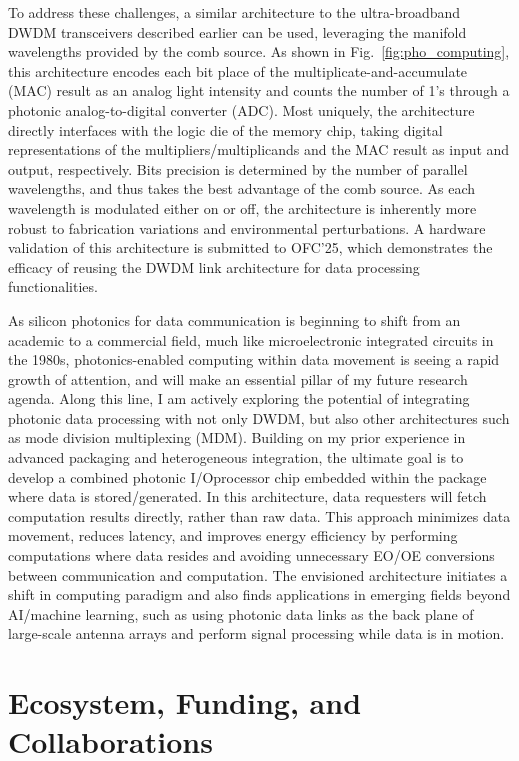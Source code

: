 To address these challenges, a similar architecture to the ultra-broadband DWDM transceivers described earlier can be used, leveraging the manifold wavelengths provided by the comb source. As shown in Fig.~\ref{fig:pho_computing}, this architecture encodes each bit place of the multiplicate-and-accumulate (MAC) result as an analog light intensity and counts the number of 1's through a photonic analog-to-digital converter (ADC). Most uniquely, the architecture directly interfaces with the logic die of the memory chip, taking digital representations of the multipliers/multiplicands and the MAC result as input and output, respectively. Bits precision is determined by the number of parallel wavelengths, and thus takes the best advantage of the comb source. As each wavelength is modulated either on or off, the architecture is inherently more robust to fabrication variations and environmental perturbations. A hardware validation of this architecture is submitted to OFC'25, which demonstrates the efficacy of reusing the DWDM link architecture for data processing functionalities.

As silicon photonics for data communication is beginning to shift from an academic to a commercial field, much like microelectronic integrated circuits in the 1980s, photonics-enabled computing within data movement is seeing a rapid growth of attention, and will make an essential pillar of my future research agenda. Along this line, I am actively exploring the potential of integrating photonic data processing with not only DWDM, but also other architectures such as mode division multiplexing (MDM). Building on my prior experience in advanced packaging and heterogeneous integration, the ultimate goal is to develop a combined photonic I/O\textendash{}processor chip embedded within the package where data is stored/generated. In this architecture, data requesters will fetch computation results directly, rather than raw data. This approach minimizes data movement, reduces latency, and improves energy efficiency by performing computations where data resides and avoiding unnecessary EO/OE conversions between communication and computation. The envisioned architecture initiates a shift in computing paradigm and also finds applications in emerging fields beyond AI/machine learning, such as using photonic data links as the back plane of large-scale antenna arrays and perform signal processing while data is in motion.

\section*{Ecosystem, Funding, and Collaborations}

